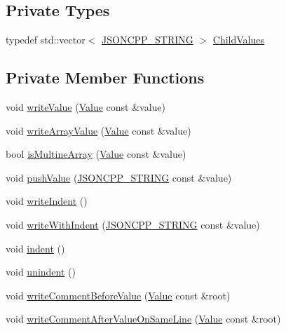 \subsection*{Private Types}
\begin{DoxyCompactItemize}
\item 
typedef std\+::vector$<$ \hyperlink{config_8h_a1e723f95759de062585bc4a8fd3fa4be}{J\+S\+O\+N\+C\+P\+P\+\_\+\+S\+T\+R\+I\+NG} $>$ \hyperlink{struct_json_1_1_built_styled_stream_writer_a63196b38400e5ce452f65ce856d47b6f}{Child\+Values}
\end{DoxyCompactItemize}
\subsection*{Private Member Functions}
\begin{DoxyCompactItemize}
\item 
void \hyperlink{struct_json_1_1_built_styled_stream_writer_a7c9da861861e570a51b45f270c9ff150}{write\+Value} (\hyperlink{class_json_1_1_value}{Value} const \&value)
\item 
void \hyperlink{struct_json_1_1_built_styled_stream_writer_acd20e9274bbcf7876ef3af2e7d23a31f}{write\+Array\+Value} (\hyperlink{class_json_1_1_value}{Value} const \&value)
\item 
bool \hyperlink{struct_json_1_1_built_styled_stream_writer_af423fd33b3d580506ea3efc53b05a077}{is\+Multine\+Array} (\hyperlink{class_json_1_1_value}{Value} const \&value)
\item 
void \hyperlink{struct_json_1_1_built_styled_stream_writer_a91e8535508412eea04d77c0cafdf15aa}{push\+Value} (\hyperlink{config_8h_a1e723f95759de062585bc4a8fd3fa4be}{J\+S\+O\+N\+C\+P\+P\+\_\+\+S\+T\+R\+I\+NG} const \&value)
\item 
void \hyperlink{struct_json_1_1_built_styled_stream_writer_a2b38a3714d415c4bd3b4812897130f3d}{write\+Indent} ()
\item 
void \hyperlink{struct_json_1_1_built_styled_stream_writer_a6e80e1a0d5f64df2ec48c3c3b1284990}{write\+With\+Indent} (\hyperlink{config_8h_a1e723f95759de062585bc4a8fd3fa4be}{J\+S\+O\+N\+C\+P\+P\+\_\+\+S\+T\+R\+I\+NG} const \&value)
\item 
void \hyperlink{struct_json_1_1_built_styled_stream_writer_a73e09692a2cfbd6e67836b060dc34a9f}{indent} ()
\item 
void \hyperlink{struct_json_1_1_built_styled_stream_writer_a0da6c6f603e00c8c6e38af553edd8c55}{unindent} ()
\item 
void \hyperlink{struct_json_1_1_built_styled_stream_writer_a32c4afca4e08fba79bb0a80a8010283a}{write\+Comment\+Before\+Value} (\hyperlink{class_json_1_1_value}{Value} const \&root)
\item 
void \hyperlink{struct_json_1_1_built_styled_stream_writer_a89625b134fce0255263ca40e6125742b}{write\+Comment\+After\+Value\+On\+Same\+Line} (\hyperlink{class_json_1_1_value}{Value} const \&root)
\end{DoxyCompactItemize}

